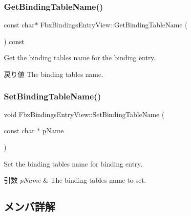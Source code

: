 \subsubsection{\texorpdfstring{Get\+Binding\+Table\+Name()}{GetBindingTableName()}}
{\footnotesize\ttfamily const char$\ast$ Fbx\+Bindings\+Entry\+View\+::\+Get\+Binding\+Table\+Name (\begin{DoxyParamCaption}{ }\end{DoxyParamCaption}) const}

Get the binding table\textquotesingle{}s name for the binding entry. \begin{DoxyReturn}{戻り値}
The binding table\textquotesingle{}s name. 
\end{DoxyReturn}
\mbox{\label{class_fbx_bindings_entry_view_af367ef628865d839cc034acf224ffe78}} 
\subsubsection{\texorpdfstring{Set\+Binding\+Table\+Name()}{SetBindingTableName()}}
{\footnotesize\ttfamily void Fbx\+Bindings\+Entry\+View\+::\+Set\+Binding\+Table\+Name (\begin{DoxyParamCaption}\item[{const char $\ast$}]{p\+Name }\end{DoxyParamCaption})}

Set the binding table\textquotesingle{}s name for binding entry. 
\begin{DoxyParams}{引数}
{\em p\+Name} & The binding table\textquotesingle{}s name to set. \\
\hline
\end{DoxyParams}


\subsection{メンバ詳解}
\mbox{\label{class_fbx_bindings_entry_view_a209f878b5007e944ca37fb6f73139c2e}} 
